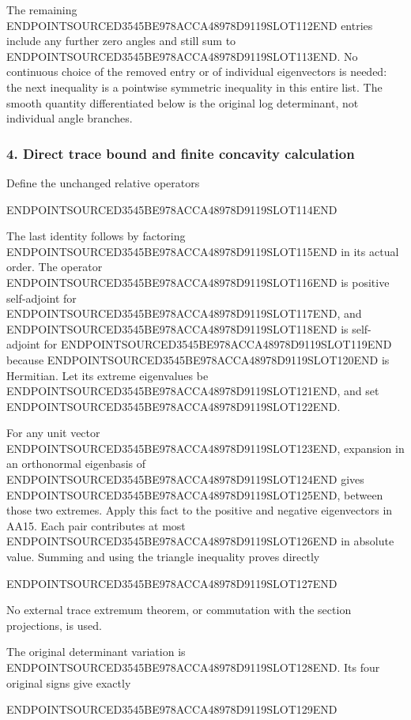 The remaining ENDPOINTSOURCED3545BE978ACCA48978D9119SLOT112END entries include any further zero angles and still sum to ENDPOINTSOURCED3545BE978ACCA48978D9119SLOT113END. No continuous choice of the removed entry or of individual eigenvectors is needed: the next inequality is a pointwise symmetric inequality in this entire list. The smooth quantity differentiated below is the original log determinant, not individual angle branches.

\subsubsection{4. Direct trace bound and finite concavity calculation}\label{endpoint-all_degree_angle_review--direct-trace-bound-and-finite-concavity-calculation}

Define the unchanged relative operators

ENDPOINTSOURCED3545BE978ACCA48978D9119SLOT114END

The last identity follows by factoring ENDPOINTSOURCED3545BE978ACCA48978D9119SLOT115END in its actual order. The operator ENDPOINTSOURCED3545BE978ACCA48978D9119SLOT116END is positive self-adjoint for ENDPOINTSOURCED3545BE978ACCA48978D9119SLOT117END, and ENDPOINTSOURCED3545BE978ACCA48978D9119SLOT118END is self-adjoint for ENDPOINTSOURCED3545BE978ACCA48978D9119SLOT119END because ENDPOINTSOURCED3545BE978ACCA48978D9119SLOT120END is Hermitian. Let its extreme eigenvalues be ENDPOINTSOURCED3545BE978ACCA48978D9119SLOT121END, and set ENDPOINTSOURCED3545BE978ACCA48978D9119SLOT122END.

For any unit vector ENDPOINTSOURCED3545BE978ACCA48978D9119SLOT123END, expansion in an orthonormal eigenbasis of ENDPOINTSOURCED3545BE978ACCA48978D9119SLOT124END gives ENDPOINTSOURCED3545BE978ACCA48978D9119SLOT125END, between those two extremes. Apply this fact to the positive and negative eigenvectors in AA15. Each pair contributes at most ENDPOINTSOURCED3545BE978ACCA48978D9119SLOT126END in absolute value. Summing and using the triangle inequality proves directly

ENDPOINTSOURCED3545BE978ACCA48978D9119SLOT127END

No external trace extremum theorem, or commutation with the section projections, is used.

The original determinant variation is ENDPOINTSOURCED3545BE978ACCA48978D9119SLOT128END. Its four original signs give exactly

ENDPOINTSOURCED3545BE978ACCA48978D9119SLOT129END

